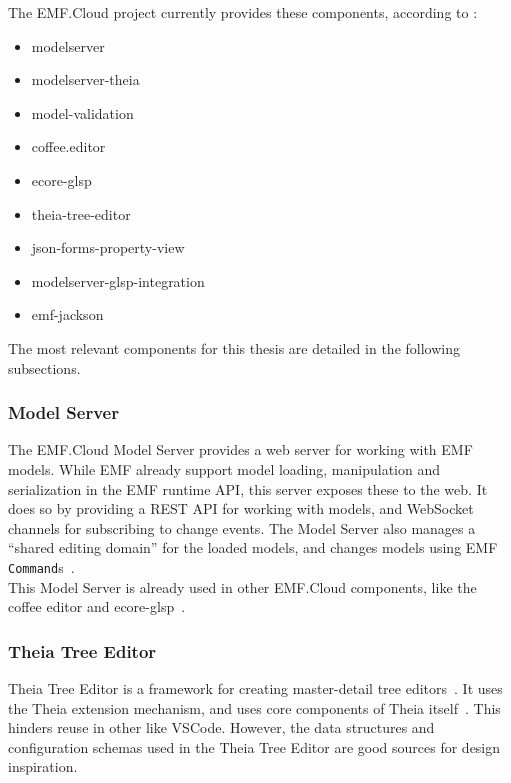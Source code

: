 The EMF.Cloud project currently provides these components, according to \cite{tobiasortmayrEclipseemfcloudEmfcloud2021}:

\begin{itemize}
  \item modelserver
  \item modelserver-theia
  \item model-validation
  \item coffee.editor
  \item ecore-glsp
  \item theia-tree-editor
  \item json-forms-property-view
  \item modelserver-glsp-integration
  \item emf-jackson
\end{itemize}

The most relevant components for this thesis are detailed in the following subsections.

\subsubsection{Model Server}
The EMF.Cloud Model Server provides a web server for working with \acrshort{EMF} models.
While \acrshort{EMF} already support model loading, manipulation and serialization in the \acrshort{EMF} runtime \acrshort{API}, this server exposes these to the web.
It does so by providing a \gls{REST} \acrshort{API} for working with models, and \gls{WebSocket} channels for subscribing to change events.
The Model Server also manages a ``shared editing domain'' for the loaded models, and changes models using \acrshort{EMF} \texttt{Command}s~\cite{foundationEMFCloud}.\\

This Model Server is already used in other EMF.Cloud components, like the coffee editor and ecore-glsp~\cite{eugenneufeldEclipseemfcloudCoffeeeditor2021,ninadoschekEclipseemfcloudEcoreglsp2021}.

\subsubsection{Theia Tree Editor}
Theia Tree Editor is a framework for creating master-detail tree editors~\cite{foundationEMFCloud}.
It uses the Theia extension mechanism, and uses core components of \gls{Theia} itself~\cite{rekstadModelingEnvironmentCloud2020}.
This hinders reuse in other  like \gls{VSCode}.
However, the data structures and configuration schemas used in the Theia Tree Editor are good sources for design inspiration.

